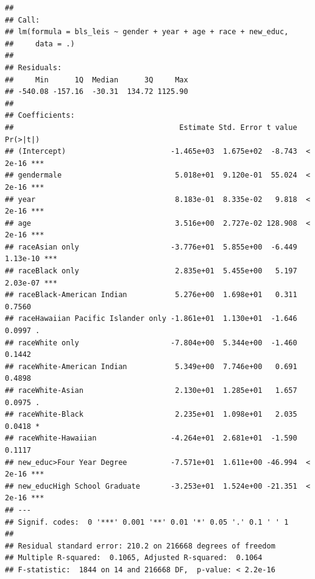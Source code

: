 \documentclass[
]{article}
\begin{document}
\begin{verbatim}
## 
## Call:
## lm(formula = bls_leis ~ gender + year + age + race + new_educ, 
##     data = .)
## 
## Residuals:
##     Min      1Q  Median      3Q     Max 
## -540.08 -157.16  -30.31  134.72 1125.90 
## 
## Coefficients:
##                                      Estimate Std. Error t value Pr(>|t|)    
## (Intercept)                        -1.465e+03  1.675e+02  -8.743  < 2e-16 ***
## gendermale                          5.018e+01  9.120e-01  55.024  < 2e-16 ***
## year                                8.183e-01  8.335e-02   9.818  < 2e-16 ***
## age                                 3.516e+00  2.727e-02 128.908  < 2e-16 ***
## raceAsian only                     -3.776e+01  5.855e+00  -6.449 1.13e-10 ***
## raceBlack only                      2.835e+01  5.455e+00   5.197 2.03e-07 ***
## raceBlack-American Indian           5.276e+00  1.698e+01   0.311   0.7560    
## raceHawaiian Pacific Islander only -1.861e+01  1.130e+01  -1.646   0.0997 .  
## raceWhite only                     -7.804e+00  5.344e+00  -1.460   0.1442    
## raceWhite-American Indian           5.349e+00  7.746e+00   0.691   0.4898    
## raceWhite-Asian                     2.130e+01  1.285e+01   1.657   0.0975 .  
## raceWhite-Black                     2.235e+01  1.098e+01   2.035   0.0418 *  
## raceWhite-Hawaiian                 -4.264e+01  2.681e+01  -1.590   0.1117    
## new_educ>Four Year Degree          -7.571e+01  1.611e+00 -46.994  < 2e-16 ***
## new_educHigh School Graduate       -3.253e+01  1.524e+00 -21.351  < 2e-16 ***
## ---
## Signif. codes:  0 '***' 0.001 '**' 0.01 '*' 0.05 '.' 0.1 ' ' 1
## 
## Residual standard error: 210.2 on 216668 degrees of freedom
## Multiple R-squared:  0.1065, Adjusted R-squared:  0.1064 
## F-statistic:  1844 on 14 and 216668 DF,  p-value: < 2.2e-16
\end{verbatim}
\end{document}
